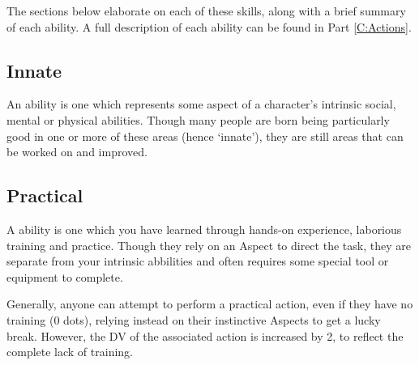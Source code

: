 The sections below elaborate on each of these skills, along with a brief summary of each ability. A full description of each ability can be found in Part \ref{C:Actions}.



\subsection{Innate}

An  ability is one which represents some aspect of a character's intrinsic social, mental or physical abilities. Though many people are born being particularly good in one or more of these areas (hence `innate'), they are still areas that can be worked on and improved. 


\abilityTable
{
}


\subsection{Practical}

A  ability is one which you have learned through hands-on experience, laborious training and practice. Though they rely on an Aspect to direct the task, they are separate from your intrinsic abbilities and often requires some special tool or equipment to complete. 

Generally, anyone can attempt to perform a practical action, even if they have no training (0 dots), relying instead on their instinctive Aspects to get a lucky break. However, the DV of the associated action is increased by 2, to reflect the complete lack of training. 
 
